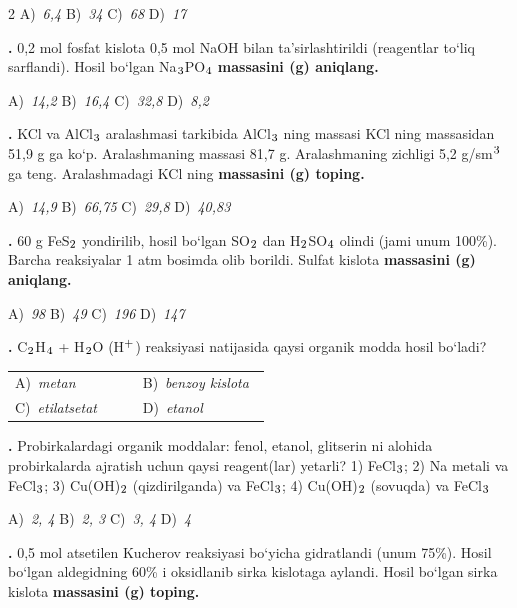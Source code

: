 \documentclass[11pt,a4paper]{article}
\renewcommand{\textsubscript}[1]{\ensuremath{_{\text{\fontsize{8}{8}\selectfont #1}}}}
\renewcommand{\textsuperscript}[1]{\ensuremath{^{\text{\fontsize{8}{8}\selectfont #1}}}}
\newcommand{\qn}[1]{\textbf{\fontsize{11.5}{13}\selectfont #1}}
\newcommand{\qsep}{\par\vspace{13pt}}
\begin{document}
\begin{multicols}{2}
\noindent A)~\textsl{6,4} \hfill B)~\textsl{34} \hfill C)~\textsl{68} \hfill D)~\textsl{17}\par
\qsep
\noindent\qn{17.} 0,2 mol fosfat kislota 0,5 mol NaOH bilan ta'sirlashtirildi (reagentlar to`liq sarflandi). Hosil bo`lgan Na\textsubscript{3}PO\textsubscript{4} \textbf{massasini (g) aniqlang.}

\noindent A)~\textsl{14,2} \hfill B)~\textsl{16,4} \hfill C)~\textsl{32,8} \hfill D)~\textsl{8,2}\par
\qsep
\noindent\qn{18.} KCl va AlCl\textsubscript{3} aralashmasi tarkibida AlCl\textsubscript{3} ning massasi KCl ning massasidan 51,9 g ga ko`p. Aralashmaning massasi 81,7 g. Aralashmaning zichligi 5,2 g/sm\textsuperscript{3} ga teng. Aralashmadagi KCl ning \textbf{massasini (g) toping.}

\noindent A)~\textsl{14,9} \hfill B)~\textsl{66,75} \hfill C)~\textsl{29,8} \hfill D)~\textsl{40,83}\par
\qsep
\noindent\qn{19.} 60 g FeS\textsubscript{2} yondirilib, hosil bo`lgan SO\textsubscript{2} dan H\textsubscript{2}SO\textsubscript{4} olindi (jami unum 100\%). Barcha reaksiyalar 1 atm bosimda olib borildi. Sulfat kislota \textbf{massasini (g) aniqlang.}

\noindent A)~\textsl{98} \hfill B)~\textsl{49} \hfill C)~\textsl{196} \hfill D)~\textsl{147}\par
\qsep
\noindent\qn{20.} C\textsubscript{2}H\textsubscript{4} + H\textsubscript{2}O (H\textsuperscript{+}) reaksiyasi natijasida qaysi organik modda hosil bo`ladi?

\noindent\begin{tabular}{@{}p{0.47\linewidth}@{}p{0.47\linewidth}@{}}
A)~\textsl{metan} & B)~\textsl{benzoy kislota} \\
C)~\textsl{etilatsetat} & D)~\textsl{etanol} \\
\end{tabular}\par
\qsep
\noindent\qn{21.} Probirkalardagi organik moddalar: fenol, etanol, glitserin ni alohida probirkalarda ajratish uchun qaysi reagent(lar) yetarli? 1) FeCl\textsubscript{3}; 2) Na metali va FeCl\textsubscript{3}; 3) Cu(OH)\textsubscript{2} (qizdirilganda) va FeCl\textsubscript{3}; 4) Cu(OH)\textsubscript{2} (sovuqda) va FeCl\textsubscript{3}

\noindent A)~\textsl{2, 4} \hfill B)~\textsl{2, 3} \hfill C)~\textsl{3, 4} \hfill D)~\textsl{4}\par
\qsep
\noindent\qn{22.} 0,5 mol atsetilen Kucherov reaksiyasi bo`yicha gidratlandi (unum 75\%). Hosil bo`lgan aldegidning 60\% i oksidlanib sirka kislotaga aylandi. Hosil bo`lgan sirka kislota \textbf{massasini (g) toping.}


\end{multicols}
\end{document}
